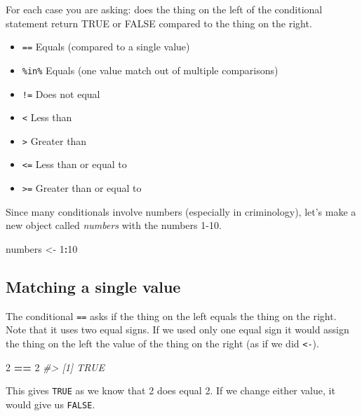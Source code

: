 \documentclass[
  12pt,
]{book}
\newenvironment{Shaded}{\begin{snugshade}}{\end{snugshade}}
\newcommand{\CommentTok}[1]{\textcolor[rgb]{0.37,0.37,0.37}{\textit{#1}}}
\newcommand{\DecValTok}[1]{\textcolor[rgb]{0.06,0.06,0.06}{#1}}
\newcommand{\NormalTok}[1]{#1}
\newcommand{\OperatorTok}[1]{\textcolor[rgb]{0.43,0.43,0.43}{\textbf{#1}}}
\newcommand{\StringTok}[1]{\textcolor[rgb]{0.5,0.5,0.5}{#1}}
\providecommand{\tightlist}{%
  \setlength{\itemsep}{0pt}\setlength{\parskip}{0pt}}
\begin{document}
For each case you are asking: does the thing on the left of the conditional statement return TRUE or FALSE compared to the thing on the right.

\begin{itemize}
\tightlist
\item
  \texttt{==} Equals (compared to a single value)
\item
  \texttt{\%in\%} Equals (one value match out of multiple comparisons)
\item
  \texttt{!=} Does not equal
\item
  \texttt{\textless{}} Less than
\item
  \texttt{\textgreater{}} Greater than
\item
  \texttt{\textless{}=} Less than or equal to
\item
  \texttt{\textgreater{}=} Greater than or equal to
\end{itemize}

Since many conditionals involve numbers (especially in criminology), let's make a new object called \emph{numbers} with the numbers 1-10.

\begin{Shaded}
\begin{Highlighting}[]
\NormalTok{numbers \textless{}{-}}\StringTok{ }\DecValTok{1}\OperatorTok{:}\DecValTok{10}
\end{Highlighting}
\end{Shaded}

\hypertarget{matching-a-single-value}{%
\subsection{Matching a single value}\label{matching-a-single-value}}

The conditional \texttt{==} asks if the thing on the left equals the thing on the right. Note that it uses two equal signs. If we used only one equal sign it would assign the thing on the left the value of the thing on the right (as if we did \texttt{\textless{}-}).

\begin{Shaded}
\begin{Highlighting}[]
\DecValTok{2} \OperatorTok{==}\StringTok{ }\DecValTok{2}
\CommentTok{\#\textgreater{} [1] TRUE}
\end{Highlighting}
\end{Shaded}

This gives \texttt{TRUE} as we know that 2 does equal 2. If we change either value, it would give us \texttt{FALSE}.
\end{document}
